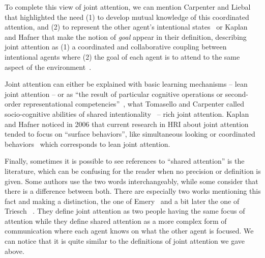 \documentclass[a4paper,11pt,twoside]{StyleThese}
\begin{document}
To complete this view of joint attention, we can mention Carpenter and Liebal that highlighted the need (1) to develop mutual knowledge of this coordinated attention, and (2) to represent the other agent’s intentional states~\cite{carpenter_2011_joint} or Kaplan and Hafner that make the notion of \emph{goal} appear in their definition, describing joint attention as (1) a coordinated and collaborative coupling between intentional agents where (2) the goal of each agent is to attend to the same aspect of the environment~\cite{kaplan_2006_challenges}.

Joint attention can either be explained with basic learning mechanisms -- lean joint attention -- or as ``the result of particular cognitive operations or second-order representational competencies''~\cite{racine_2011_getting}, \ie what Tomasello and Carpenter called socio-cognitive abilities of shared intentionality~\cite{tomasello_2007_shared} -- rich joint attention. Kaplan and Hafner noticed in 2006 that current research in HRI about joint attention tended to focus on ``surface behaviors'', like simultaneous looking or coordinated behaviors~\cite{kaplan_2006_challenges} which corresponds to lean joint attention.

Finally, sometimes it is possible to see references to ``shared attention'' is the literature, which can be confusing for the reader when no precision or definition is given. Some authors use the two words interchangeably, while some consider that there is a difference between both. There are especially two works mentioning this fact and making a distinction, the one of Emery~\cite{emery_2000_eyes} and a bit later the one of Triesch \etal~\cite{triesch_2006_gaze}. They define joint attention as two people having the same focus of attention while they define shared attention as a more complex form of communication where each agent knows on what the other agent is focused. We can notice that it is quite similar to the definitions of joint attention we gave above.
\end{document}
